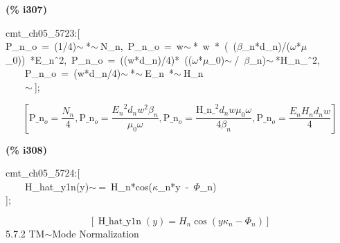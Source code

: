 \documentclass[fleqn]{article}
\begin{document}
\noindent
\begin{minipage}[t]{4.000000em}\color{red}\bfseries
(\% i307)	
\end{minipage}
\begin{minipage}[t]{\textwidth}\color{blue}
cmt\_ch05\_5723:[\\
P\_n\_o\ =\ (1/4)\ensuremath{\sim\ }*\ensuremath{\sim\ }N\_n,\ P\_n\_o\ =\ w\ensuremath{\sim\ }*\ w\ *\ (\ (\ensuremath{\beta}\_n*d\_n)/(\ensuremath{\omega}*\ensuremath{\mu}\_0))\ *E\_n\^\ 2,\ P\_n\_o\ =\ ((w*d\_n)/4)*\ ((\ensuremath{\omega}*\ensuremath{\mu}\_0)\ensuremath{\sim\ }/\ \ensuremath{\beta}\_n)\ensuremath{\sim\ }*H\_n\_\^\ 2,\\
\ \ \ \ P\_n\_o\ =\ (w*d\_n/4)\ensuremath{\sim\ }*\ensuremath{\sim\ }E\_n\ *\ensuremath{\sim\ }H\_n\\
\ \ \ \ \ensuremath{\sim\ }];
\end{minipage}
\[\displaystyle \tag{\% o307} 
\operatorname{[}{{\ensuremath{\mathrm{P\_ n}}}_o}=\frac{{N_n}}{4}\operatorname{,}{{\ensuremath{\mathrm{P\_ n}}}_o}=\frac{{{{E_n}}^{2}} {d_n} {{w}^{2}} {{\beta }_n}}{{{\mu }_0} \omega }\operatorname{,}{{\ensuremath{\mathrm{P\_ n}}}_o}=\frac{{{\ensuremath{\mathrm{H\_ n\_ }}}^{2}} {d_n} w {{\mu }_0} \omega }{4 {{\beta }_n}}\operatorname{,}{{\ensuremath{\mathrm{P\_ n}}}_o}=\frac{{E_n} {H_n} {d_n} w}{4}\operatorname{]}\mbox{}
\]


\noindent
\begin{minipage}[t]{4.000000em}\color{red}\bfseries
(\% i308)	
\end{minipage}
\begin{minipage}[t]{\textwidth}\color{blue}
cmt\_ch05\_5724:[\\
\ \ \ \ H\_hat\_y1n(y)\ensuremath{\sim\ }=\ H\_n*cos(\ensuremath{\kappa}\_n*y\ -\ \ensuremath{\Phi}\_n)\\
];
\end{minipage}
\[\displaystyle \tag{\% o308} 
\left[ \operatorname{H\_ hat\_ y1n}(y)={H_n} \cos{\left( y {{\kappa }_n}-{{\Phi }_n}\right) }\right] \mbox{}
\]
5.7.2   TM\ensuremath{\sim }Mode Normalization
\end{document}

